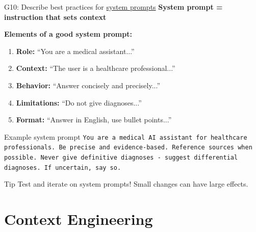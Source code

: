 \documentclass[aspectratio=169, 10pt]{beamer}
\begin{document}
\begin{frame}{G10: Describe best practices for \href{https://en.wikipedia.org/wiki/Prompt_engineering\#System_prompts}{system prompts}}
    \textbf{System prompt = instruction that sets context}

    \vspace{0.2cm}
    \textbf{Elements of a good system prompt:}
    \begin{enumerate}
        \item \textbf{Role:} ``You are a medical assistant...''
        \item \textbf{Context:} ``The user is a healthcare professional...''
        \item \textbf{Behavior:} ``Answer concisely and precisely...''
        \item \textbf{Limitations:} ``Do not give diagnoses...''
        \item \textbf{Format:} ``Answer in English, use bullet points...''
    \end{enumerate}

    \vspace{0.15cm}
    \begin{block}{\footnotesize Example system prompt}
        \scriptsize
        \texttt{You are a medical AI assistant for healthcare professionals. Be precise and evidence-based. Reference sources when possible. Never give definitive diagnoses - suggest differential diagnoses. If uncertain, say so.}
    \end{block}

    \begin{alertblock}{\footnotesize Tip}
        \footnotesize Test and iterate on system prompts! Small changes can have large effects.
    \end{alertblock}
\end{frame}

\section{Context Engineering}
\end{document}

